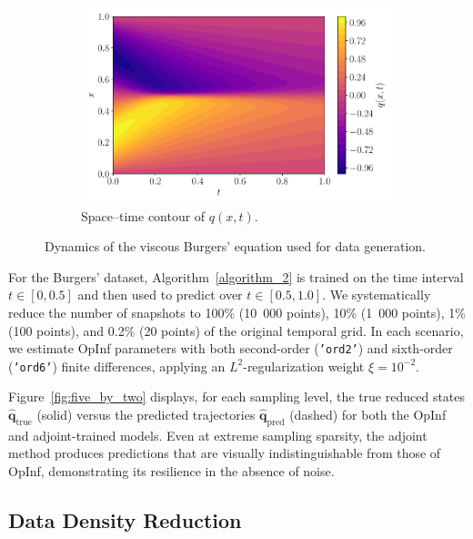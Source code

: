 \begin{figure}[h!]
  \begin{subfigure}[t]{0.5\textwidth}
    \centering
    \includegraphics[width=\textwidth]{figures/heatmap_001.pdf}
    \caption{Space–time contour of \(q(x,t)\).}
    \label{fig:burgers-contour}
  \end{subfigure}
  \caption{Dynamics of the viscous Burgers’ equation used for data generation.}
  \label{fig:burgers-data}
\end{figure}


For the Burgers’ dataset, Algorithm~\ref{algorithm_2} is trained on the time interval $t\in[0,0.5]$ and then used to predict over $t\in[0.5,1.0]$. We systematically reduce the number of snapshots to 100\% (10~000 points), 10\% (1~000 points), 1\% (100 points), and 0.2\% (20 points) of the original temporal grid. In each scenario, we estimate OpInf parameters with both second-order (\texttt{'ord2'}) and sixth-order (\texttt{'ord6'}) finite differences, applying an $L^2$-regularization weight $\xi=10^{-2}$.  

Figure~\ref{fig:five_by_two} displays, for each sampling level, the true reduced states $\hat{\mathbf{q}}_{\mathrm{true}}$ (solid) versus the predicted trajectories $\hat{\mathbf{q}}_{\mathrm{pred}}$ (dashed) for both the OpInf and adjoint-trained models. Even at extreme sampling sparsity, the adjoint method produces predictions that are visually indistinguishable from those of OpInf, demonstrating its resilience in the absence of noise.

\newpage


\subsection*{Data Density Reduction}

